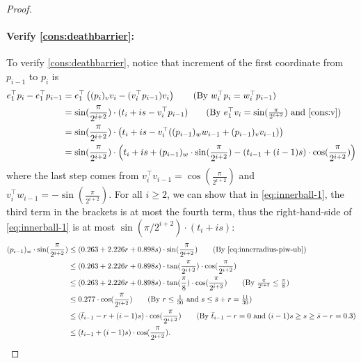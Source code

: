 \documentclass{article}\usepackage[a4paper,margin=20mm]{geometry}
\begin{document}
\begin{proof}
    \paragraph{Verify \eqref{cons:deathbarrier}:}
    To verify \eqref{cons:deathbarrier}, notice that increment of the first coordinate from $p_{i-1}$ to $p_i$ is
    \begin{align}
        e_1^\top p_i - e_1^\top p_{i-1} &= e_1^\top \left( (p_i)_v v_i - (v_i^\top p_{i-1})v_i  \right) \tag{By $w_i^\top p_i = w_i^\top p_{i-1}$} \nonumber \\
        &= \sin(\frac{\pi}{2^{i + 2}}) \cdot (t_i + is - v_i^\top p_{i-1}) \tag{By $e_1^\top v_i = \sin(\frac{\pi}{2^{i + 2}})$ and \eqref{cons:v}} \nonumber \\
        &= \sin(\frac{\pi}{2^{i + 2}}) \cdot \left(t_i + is - v_i^\top ((p_{i-1})_w w_{i-1} + (p_{i-1})_v v_{i-1}) \right) \nonumber \\
        &= \sin(\frac{\pi}{2^{i + 2}}) \cdot \left(t_i + is + (p_{i-1})_w \cdot \sin(\frac{\pi}{2^{i + 2}}) - (t_{i-1} + (i-1)s) \cdot \cos(\frac{\pi}{2^{i + 2}})  \right)  \label{eq:innerball-1}
    \end{align}
    where the last step comes from $v_i^\top v_{i-1} = \cos(\frac{\pi}{2^{i + 2}})$ and $v_i^\top w_{i-1} = -\sin(\frac{\pi}{2^{i + 2}})$.
    For all $i \geq 2$, we can show that in \eqref{eq:innerball-1}, the third term in the brackets is at most the fourth term, thus the right-hand-side of \eqref{eq:innerball-1} is at most $\sin(\pi/2^{i+2}) \cdot (t_i + is)$:
    \begin{align*}
        (p_{i-1})_w \cdot \sin(\frac{\pi}{2^{i + 2}}) &\leq  (0.263 + 2.226r + 0.898s) \cdot \sin(\frac{\pi}{2^{i+2}}) \tag{By \eqref{eq:innerradius-piw-ub}}\\
        &\leq (0.263 + 2.226r + 0.898s)\cdot \tan(\frac{\pi}{2^{i+2}}) \cdot \cos(\frac{\pi}{2^{i+2}})  \\
        &\leq (0.263 + 2.226r + 0.898s)\cdot \tan(\frac{\pi}{8}) \cdot \cos(\frac{\pi}{2^{i+2}}) \tag{By $\frac{\pi}{2^{i+2}} \leq \frac{\pi}{8}$}  \\
        &\leq 0.277 \cdot \cos(\frac{\pi}{2^{i+2}})  \tag{By $r \leq \frac{1}{30}$ and $s \leq \bar{s} + r = \frac{11}{30}$} \\
        &\leq (\bar{t}_{i-1} - r + (i-1)s)  \cdot \cos(\frac{\pi}{2^{i+2}}) \tag{By $\bar{t}_{i-1}-r = 0$ and $(i-1)s \geq s \geq \bar{s} - r =0.3$}  \\
        &\leq (t_{i-1} + (i-1)s) \cdot \cos(\frac{\pi}{2^{i+2}}).

\end{align*}
\end{proof}
\end{document}
